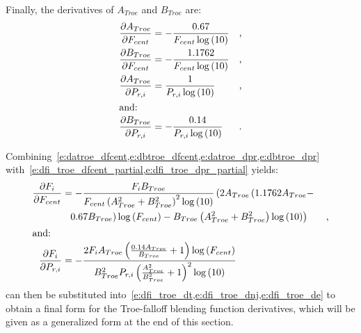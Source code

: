 \documentclass[12pt,number,sort&compress]{elsarticle}
\begin{document}
Finally, the derivatives of $A_{Troe}$ and $B_{Troe}$ are:
\begin{align}
 \frac{\partial A_{Troe} }{\partial F_{cent} } &= - \frac{0.67}{F_{cent} \log{\left (10 \right )}} & \text{,} \label{e:datroe_dfcent} \\
\frac{\partial B_{Troe} }{\partial F_{cent} } &= - \frac{1.1762}{F_{cent} \log{\left (10 \right )}} & \text{,} \label{e:dbtroe_dfcent} \\
\frac{\partial A_{Troe} }{\partial P_{r, i} } &= \frac{1}{P_{r, i} \log{\left (10 \right )}} & \text{,} \label{e:datroe_dpr} \\
\intertext{and:}
\frac{\partial B_{Troe} }{\partial P_{r, i} } &= - \frac{0.14}{P_{r, i} \log{\left (10 \right )}} & \text{.} \label{e:dbtroe_dpr} \\
\end{align}

Combining~\cref{e:datroe_dfcent,e:dbtroe_dfcent,e:datroe_dpr,e:dbtroe_dpr} with~\cref{e:dfi_troe_dfcent_partial,e:dfi_troe_dpr_partial} yields:
\begin{align}
\frac{\partial F_{i} }{\partial F_{cent} } &= - \frac{F_{i} B_{Troe}}{F_{cent} \left(A_{Troe}^{2} + B_{Troe}^{2}\right)^{2} \log{\left (10 \right )}} \left(2 A_{Troe} \left( 1.1762 A_{Troe} - \right. \right . & \nonumber \\
& \mathindent[s] \left. \left. 0.67 B_{Troe}\right) \log{\left (F_{cent} \right )} - B_{Troe} \left(A_{Troe}^{2} + B_{Troe}^{2}\right) \log{\left (10 \right )}\right) & \text{,} \label{e:dfi_troe_dfcent} \\
\intertext{and:}
\frac{\partial F_{i} }{\partial P_{r, i} } &= - \frac{2 F_{i} A_{Troe} \left(\frac{0.14 A_{Troe}}{B_{Troe}} + 1\right) \log{\left (F_{cent} \right )}}{B_{Troe}^{2} P_{r, i} \left(\frac{A_{Troe}^{2}}{B_{Troe}^{2}} + 1\right)^{2} \log{\left (10 \right )}} \label{e:dfi_troe_dpr} &
\end{align}
 can then be substituted into~\cref{e:dfi_troe_dt,e:dfi_troe_dnj,e:dfi_troe_de} to obtain a final form for the Troe-falloff blending function derivatives, which will be given as a generalized form at the end of this section.
\end{document}
